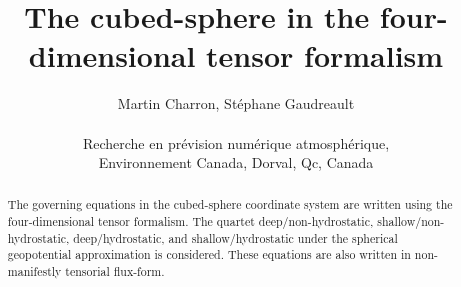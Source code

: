 \documentclass{article}
\begin{document}
\title{The cubed-sphere in the four-dimensional tensor formalism}

\author{Martin Charron, St\'ephane Gaudreault \\
\\ \vspace{6pt} Recherche en pr\'evision num\'erique atmosph\'erique, 
\\ Environnement Canada, Dorval, Qc, Canada}

\maketitle

\begin{abstract}
The governing equations in the cubed-sphere coordinate system are written using the four-dimensional tensor formalism. The quartet deep/non-hydrostatic, shallow/non-hydrostatic, deep/hydrostatic, and shallow/hydrostatic under the spherical geopotential approximation is considered. These equations are also written in non-manifestly tensorial flux-form.
\end{abstract}
\end{document}
